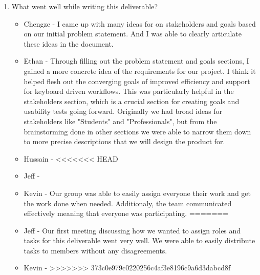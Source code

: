\documentclass{article}
\begin{document}
\begin{enumerate}
    \item What went well while writing this deliverable? 
    \begin{itemize}
        \item Chengze - I came up with many ideas for on stakeholders 
        and goals based on our initial problem statement. And I was 
        able to clearly articulate these ideas in the document.
        \item Ethan - Through filling out the problem statement and goals
          sections, I gained a more concrete idea of the requirements for our
          project. I think it helped flesh out the converging goals of improved
          efficiency and support for keyboard driven workflows. This was
          particularly helpful in the stakeholders section, which is a crucial
          section for creating goals and usability tests going forward.
          Originally we had broad ideas for stakeholders like "Students" and
          "Professionals", but from the brainstorming done in other sections we
          were able to narrow them down to more precise descriptions that we
          will design the product for.
        \item Hussain -
<<<<<<< HEAD
        \item Jeff - 
        \item Kevin - Our group was able to easily assign everyone their work 
        and get the work done when needed. Additionaly, the team communicated 
        effectively meaning that everyone was participating.
=======
        \item Jeff - Our first meeting discussing how we wanted to assign roles 
        and tasks for this deliverable went very well. 
        We were able to easily distribute tasks to members without any disagreements.
        \item Kevin -
>>>>>>> 373c0e979c0220256c4af3e8196c9a6d3dabcd8f
    \end{itemize}


\end{enumerate}
\end{document}
